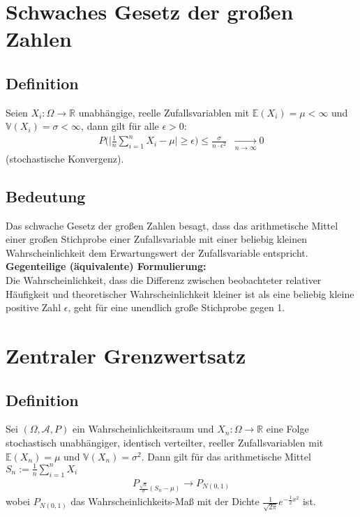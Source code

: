 \documentclass[a4paper]{article}
\begin{document}
\section{Schwaches Gesetz der großen Zahlen}

\subsection{Definition}
Seien $X_i : \Omega \to \mathbb{R}$ unabhängige, reelle Zufallsvariablen mit $\mathbb{E}(X_i) = \mu < \infty$ und $\mathbb{V}(X_i) = \sigma < \infty$, dann gilt für alle $\epsilon > 0$:
\begin{align*}
P \bigl  ( \bigl | \frac{1}{n} \sum_{i=1}^{n} X_i - \mu \bigr |  \geq \epsilon \bigr) \leq \frac{\sigma}{ n \cdot \epsilon^2} \; \; \underset{n \to \infty}{\longrightarrow} 0
\end{align*}
(stochastische Konvergenz). 

\subsection{Bedeutung}
Das schwache Gesetz der großen Zahlen besagt, dass das arithmetische Mittel einer großen Stichprobe einer Zufallsvariable mit einer beliebig kleinen Wahrscheinlichkeit dem Erwartungswert der Zufallsvariable entspricht.\\

\textbf{Gegenteilige (äquivalente) Formulierung:}\\
Die Wahrscheinlichkeit, dass die Differenz zwischen beobachteter relativer Häufigkeit und theoretischer Wahrscheinlichkeit kleiner ist als eine beliebig kleine positive Zahl $\epsilon$, geht für eine unendlich große Stichprobe gegen 1.


\section{Zentraler Grenzwertsatz}

\subsection{Definition}
Sei $(\Omega, \mathcal{A}, P)$ ein Wahrscheinlichkeitsraum und $X_n :  \Omega \to \mathbb{R}$  eine Folge stochastisch unabhängiger, identisch verteilter, reeller Zufallsvariablen mit $\mathbb{E}(X_n) = \mu$ und $\mathbb{V}(X_n)= \sigma^2$. Dann gilt für das arithmetische Mittel $S_n:= \frac{1}{n} \sum_{i=1}^n X_i$
\begin{align*}
P_{ \frac{\sqrt{n}}{\sigma} (S_n-\mu)} \to P_{N(0,1)}
\end{align*}
wobei $ P_{N(0,1)}$ das Wahrscheinlichkeits-Maß mit der Dichte $ \frac {1}{ \sqrt{2\pi}}e^{- \frac {1}{2} x^2}$ ist.
\end{document}
